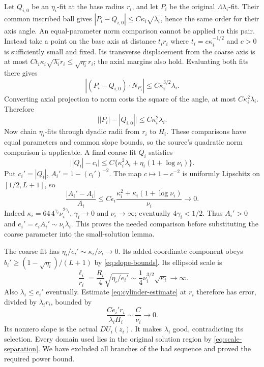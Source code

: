 Let $Q_{i,0}$ be an $\eta_i$-fit at the base radius $r_i$, and
let $P_i$ be the original $\Lambda\lambda_i$-fit. Their common
inscribed ball gives
$|P_i-Q_{i,0}|\leq C\kappa_i\sqrt{\lambda_i}$, hence the same
order for their axis angle. An equal-parameter norm comparison
cannot be applied to this pair. Instead take a point on the base
axis at distance $t_ir_i$ where $t_i=c\kappa_i^{-1/2}$ and $c>0$
is sufficiently small and fixed. Its transverse displacement from
the coarse axis is at most
$Ct_i\kappa_i\sqrt{\lambda_i}r_i\leq\sqrt{\eta_i}r_i$;
the axial margins also hold. Evaluating both fits there gives
\[
 |(P_i-Q_{i,0})\cdot N_{P_i}|
       \leq C\kappa_i^{3/2}\lambda_i.
\]
Converting axial projection to norm costs the square of the angle,
at most $C\kappa_i^2\lambda_i$. Therefore
\begin{equation}\label{eq:unequal-norm}
 \bigl||P_i|-|Q_{i,0}|\bigr|\leq C\kappa_i^2\lambda_i.
\end{equation}
Now chain $\eta_i$-fits through dyadic radii from $r_i$ to $H_i$.
These comparisons have equal parameters and common slope bounds,
so the source's quadratic norm comparison is applicable. A final
coarse fit $Q_i$ satisfies
\begin{equation}\label{eq:coarse-norm}
 \bigl||Q_i|-c_i\bigr|\leq
 C\{\kappa_i^2\lambda_i+\eta_i(1+\log\nu_i)\}.
\end{equation}
Put $c_i'=|Q_i|$, $A_i'=1-(c_i')^{-2}$. The map
$c\mapsto1-c^{-2}$ is uniformly Lipschitz on $[1/2,L+1]$, so
\[
 \frac{|A_i'-A_i|}{A_i}
 \leq C\epsilon_i
   \frac{\kappa_i^2+\kappa_i(1+\log\nu_i)}{\nu_i}
 \longrightarrow0.
\]
Indeed $\kappa_i=64\,4^{\gamma_i}\nu_i^{2\gamma_i}$,
$\gamma_i\to0$ and $\nu_i\to\infty$; eventually
$4\gamma_i<1/2$. Thus $A_i'>0$ and
$e_i'=\epsilon_i A_i'\sim\nu_i\lambda_i$.
This proves the needed comparison before substituting the coarse
parameter into the small-solution lemma.

The coarse fit has
$\eta_i/e_i'\sim\kappa_i/\nu_i\to0$. Its added-coordinate
component obeys
$b_i'\geq(1-\sqrt{\eta_i})/(L+1)$ by
\eqref{eq:slope-bounds}. Its ellipsoid scale is
\[
 \frac{\ell_i}{r_i}
 =\frac{R_i}{4}\sqrt{\eta_i/e_i'}
 \sim\frac14\nu_i^{3/2}\sqrt{\kappa_i}\longrightarrow\infty.
\]
Also $\lambda_i\leq e_i'$ eventually. Estimate
\eqref{eq:cylinder-estimate} at $r_i$ therefore has error, divided
by $\lambda_ir_i$, bounded by
\[
 \frac{Ce_i'r_i}{\lambda_iH_i}\sim\frac C{\nu_i}\longrightarrow0.
\]
Its nonzero slope is the actual $DU_i(z_i)$. It makes
$\lambda_i$ good, contradicting its selection. Every domain used
lies in the original solution region by
\eqref{eq:scale-separation}. We have excluded all branches of the
bad sequence and proved the required power bound.
